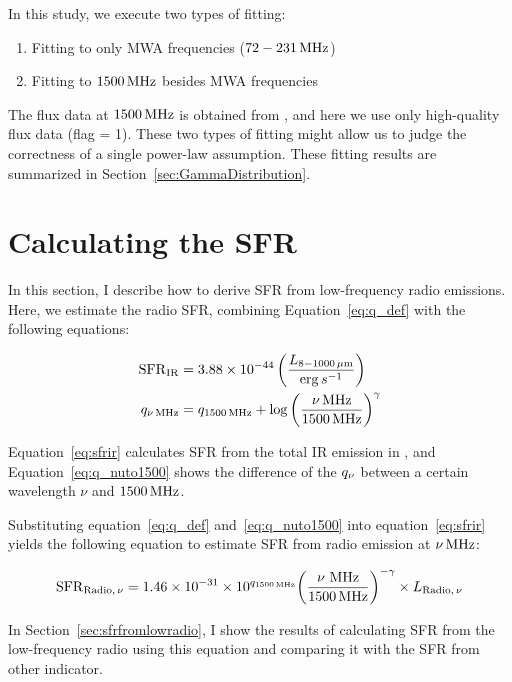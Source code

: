 In this study, we execute two types of fitting:

\begin{enumerate}
    \item Fitting to only MWA frequencies ($72-231\,\mathrm{MHz}$)
    \item Fitting to $1500\,\mathrm{MHz}$ besides MWA frequencies
\end{enumerate}

The flux data at $1500\,\mathrm{MHz}$ is obtained from \citet{Boselli2015}, and here we use only high-quality flux data (flag = 1).
These two types of fitting might allow us to judge the correctness of a single power-law assumption.
These fitting results are summarized in Section~\ref{sec:GammaDistribution}.



\section{Calculating the SFR}\label{sec:calculatingsfr}
In this section, I describe how to derive SFR from low-frequency radio emissions.\\
Here, we estimate the radio SFR, combining Equation~\ref{eq:q_def} with the following equations:

\begin{align}
    \mathrm{SFR}_{\mathrm{IR}} &= 3.88 \times 10^{-44}\left(\frac{L_{\mathrm{8-1000\,\mu m}}}{\mathrm{erg}\,s^{-1}}\right)\label{eq:sfrir}\\
    q_{\nu\,\mathrm{MHz}} &= q_{\mathrm{1500\,\mathrm{MHz}}} + \log{\left(\frac{\nu\,\mathrm{MHz}}{1500\,\mathrm{MHz}}\right)}^{\gamma}\label{eq:q_nuto1500}
\end{align}

Equation~\ref{eq:sfrir} calculates SFR from the total IR emission in \citet{Murphy2011}, and Equation~\ref{eq:q_nuto1500} shows the difference of the $q_{\nu}$ between a certain wavelength $\nu$ and $1500\,\mathrm{MHz}$.

Substituting equation~\ref{eq:q_def} and~\ref{eq:q_nuto1500} into equation~\ref{eq:sfrir} yields the following equation to estimate SFR from radio emission at $\nu\,\mathrm{MHz}$:

\begin{equation}\label{eq:sfrfromradio}
    \mathrm{SFR}_{\mathrm{Radio},\,\nu} = 1.46\times10^{-31}\times 10^{q_{\mathrm{1500\,\mathrm{MHz}}}} {\left(\frac{\nu\,\,\mathrm{MHz}}{1500\,\mathrm{MHz}}\right)}^{-\gamma} \times L_{\mathrm{Radio},\,\nu}
\end{equation}

In Section~\ref{sec:sfrfromlowradio}, I show the results of calculating SFR from the low-frequency radio using this equation and comparing it with the SFR from other indicator.



%
%
